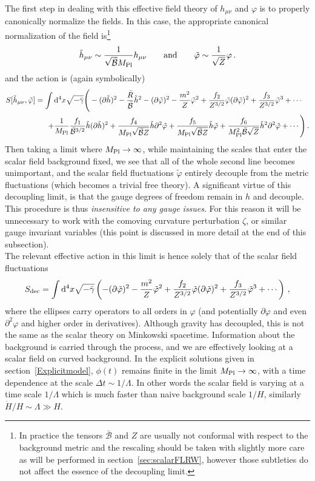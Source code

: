 \documentclass[12pt]{article}
\def\ba{\begin{eqnarray}}
\def\ea{\end{eqnarray}}
\def\mpl{M_{\rm Pl}}
\def\d{\mathrm{d}}
\def\({\left(}
\def\){\right)}
\def\nn{\nonumber}
\def\p{\partial}
\def\mn{_{\mu \nu}}
\def\p{\partial}
\begin{document}
The first step in dealing with this effective field theory of $h\mn$ and $\varphi$ is to properly canonically normalize the fields.  In this case, the appropriate canonical normalization of the field is\footnote{In practice the tensors $\bar{\mathcal B}$ and $Z$ are usually not conformal with respect to the background metric and the rescaling should be taken with slightly more care as will be performed in section~\ref{sec:scalarFLRW}, however those subtleties do not affect the essence of the decoupling limit. }
\ba
\label{eq:normalization}
\tilde h\mn \sim \frac{1}{\sqrt{\bar{\mathcal{B}}} \mpl} h\mn \qquad {\rm and} \qquad \tilde \varphi \sim \frac{1}{\sqrt{Z}} \varphi\,.
\ea
and the action is (again symbolically)
\ba
S[\tilde h\mn,\tilde \varphi]=  \int \d^4 x \sqrt{-\bar \gamma} \Bigg( -(\p \tilde h)^2 - \frac{\bar R}{\bar{\mathcal{B}}} {\tilde h}^2   -(\p \tilde \varphi)^2 -  \frac{m^2}{Z} \tilde \varphi^2 + \frac{f_2}{Z^{3/2}} \tilde \varphi (\p \tilde \varphi)^2 + \frac{f_3}{Z^{3/2}} \tilde \varphi^3  + \cdots\quad \\
+ \frac{1}{\mpl} \frac{f_1}{\bar{\mathcal{B}}^{3/2}} \tilde h (\p \tilde h)^2
+ \frac{f_4}{\mpl \sqrt{\bar{\mathcal{B}} Z}}\tilde h \p^2 \tilde \varphi +  \frac{f_5}{\mpl \sqrt{\bar{\mathcal{B}} Z}} \tilde h  \tilde \varphi + \frac{f_6}{\mpl^2 \bar{\mathcal{B}}\sqrt{Z}} \tilde h^2 \p^2 \tilde \varphi + \cdots \nn
\Bigg)\,.
\ea
Then taking a limit where $\mpl\to \infty$, while maintaining the scales that enter the scalar field background fixed, we see that all of the whole second line becomes unimportant, and the scalar field fluctuations $\tilde \varphi$ entirely decouple from the metric fluctuations (which becomes a trivial free theory). A significant virtue of this decoupling limit, is that the gauge degrees of freedom remain in $h$ and decouple. This procedure is thus {\it insensitive to any gauge issues}. For this reason it will be unnecessary to work with the comoving curvature perturbation $\zeta$, or similar gauge invariant variables (this point is discussed in more detail at the end of this subsection).
\\

The relevant effective action in this limit is hence solely that of the scalar field fluctuations
\ba
S_{\rm dec}= \int \d^4 x \sqrt{-\bar \gamma} \(- (\p \tilde \varphi)^2 -  \frac{m^2}{Z} \tilde \varphi^2 + \frac{f_2}{Z^{3/2}}\tilde \varphi (\p \tilde \varphi)^2+ \frac{f_3}{Z^{3/2}} \tilde \varphi^3 + \cdots \)\,,
\ea
where the ellipses carry operators to all orders in $\varphi$ (and potentially $\p \varphi$ and even $\p^2 \varphi$ and higher order in derivatives). Although gravity has decoupled, this is not the same as the scalar theory on Minkowski spacetime. Information about the background is carried through the process, and we are effectively looking at a scalar field on curved background. In the explicit solutions given in section~\ref{Explicitmodel}, $\phi(t)$ remains finite in the limit $\mpl \rightarrow \infty$, with a time dependence at the scale $\Delta t \sim 1/\Lambda$. In other words the scalar field is varying at a time scale $1/\Lambda$ which is much faster than naive background scale $1/H$, similarly $\dot H /H \sim  \Lambda \gg H$.
\\
\end{document}
